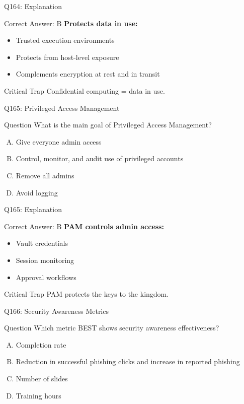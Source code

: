 \documentclass{beamer}
\begin{document}
	\begin{frame}{Q164: Explanation}
		\begin{block}{Correct Answer: B}
			\textbf{Protects data in use:}
			\begin{itemize}
				\item Trusted execution environments
				\item Protects from host-level exposure
				\item Complements encryption at rest and in transit
			\end{itemize}
		\end{block}
		\begin{alertblock}{Critical Trap}
			Confidential computing = data in use.
		\end{alertblock}
	\end{frame}
	
	\begin{frame}{Q165: Privileged Access Management}
		\begin{block}{Question}
			What is the main goal of Privileged Access Management?
		\end{block}
		\begin{enumerate}[(A)]
			\item Give everyone admin access
			\item Control, monitor, and audit use of privileged accounts
			\item Remove all admins
			\item Avoid logging
		\end{enumerate}
	\end{frame}
	
	\begin{frame}{Q165: Explanation}
		\begin{block}{Correct Answer: B}
			\textbf{PAM controls admin access:}
			\begin{itemize}
				\item Vault credentials
				\item Session monitoring
				\item Approval workflows
			\end{itemize}
		\end{block}
		\begin{alertblock}{Critical Trap}
			PAM protects the keys to the kingdom.
		\end{alertblock}
	\end{frame}
	
	\begin{frame}{Q166: Security Awareness Metrics}
		\begin{block}{Question}
			Which metric BEST shows security awareness effectiveness?
		\end{block}
		\begin{enumerate}[(A)]
			\item Completion rate
			\item Reduction in successful phishing clicks and increase in reported phishing
			\item Number of slides
			\item Training hours
		\end{enumerate}
	\end{frame}
	
\end{document}
